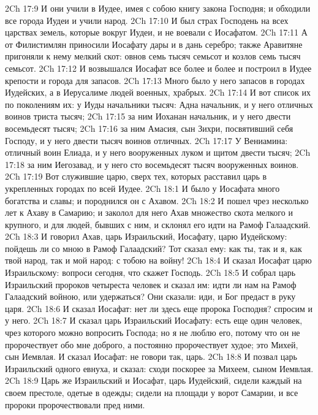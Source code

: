 \vs 2Ch 17:9 И они учили в Иудее, имея с собою книгу закона Господня; и обходили все города Иудеи и учили народ.
\vs 2Ch 17:10 И был страх Господень на всех царствах земель, которые вокруг Иудеи, и не воевали с Иосафатом.
\vs 2Ch 17:11 А от Филистимлян приносили Иосафату дары и в дань серебро; также Аравитяне пригоняли к нему мелкий скот: овнов семь тысяч семьсот и козлов семь тысяч семьсот.
\rsbpar\vs 2Ch 17:12 И возвышался Иосафат все более и более и построил в Иудее крепости и города для запасов.
\vs 2Ch 17:13 Много было у него запасов в городах Иудейских, а в Иерусалиме людей военных, храбрых.
\vs 2Ch 17:14 И вот список их по поколениям их: у Иуды начальники тысяч: Адна начальник, и у него отличных воинов триста тысяч;
\vs 2Ch 17:15 за ним Иоханан начальник, и у него двести восемьдесят тысяч;
\vs 2Ch 17:16 за ним Амасия, сын Зихри, посвятивший себя Господу, и у него двести тысяч воинов отличных.
\vs 2Ch 17:17 У Вениамина: отличный воин Елиада, и у него вооруженных луком и щитом двести тысяч;
\vs 2Ch 17:18 за ним Иегозавад, и у него сто восемьдесят тысяч вооруженных воинов.
\vs 2Ch 17:19 Вот служившие царю, сверх тех, которых расставил царь в укрепленных городах по всей Иудее.
\vs 2Ch 18:1 И было у Иосафата много богатства и славы; и породнился он с Ахавом.
\vs 2Ch 18:2 И пошел чрез несколько лет к Ахаву в Самарию; и заколол для него Ахав множество скота мелкого и крупного, и для людей, бывших с ним, и склонял его идти на Рамоф Галаадский.
\vs 2Ch 18:3 И говорил Ахав, царь Израильский, Иосафату, царю Иудейскому: пойдешь ли со мною в Рамоф Галаадский? Тот сказал ему: как ты, так и я, как твой народ, так и мой народ:  с тобою на войну!
\vs 2Ch 18:4 И сказал Иосафат царю Израильскому: вопроси сегодня, что скажет Господь.
\vs 2Ch 18:5 И собрал царь Израильский пророков четыреста человек и сказал им: идти ли нам на Рамоф Галаадский войною, или удержаться? Они сказали: иди, и Бог предаст  в руку царя.
\vs 2Ch 18:6 И сказал Иосафат: нет ли здесь еще пророка Господня? спросим и у него.
\vs 2Ch 18:7 И сказал царь Израильский Иосафату: есть еще один человек, чрез которого можно вопросить Господа; но я не люблю его, потому что он не пророчествует обо мне доброго, а постоянно пророчествует худое; это Михей, сын Иемвлая. И сказал Иосафат: не говори так, царь.
\vs 2Ch 18:8 И позвал царь Израильский одного евнуха, и сказал: сходи поскорее за Михеем, сыном Иемвлая.
\vs 2Ch 18:9 Царь же Израильский и Иосафат, царь Иудейский, сидели каждый на своем престоле, одетые в  одежды; сидели на площади у ворот Самарии, и все пророки пророчествовали пред ними.
